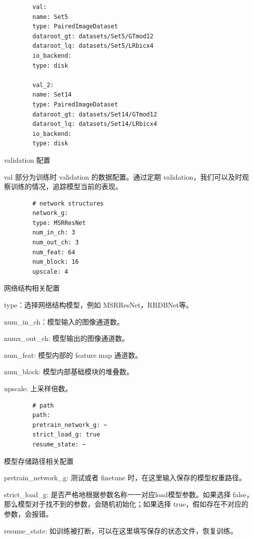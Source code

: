 \documentclass[../main.tex]{subfiles}
\begin{document}
	\begin{verbatim}
		val:
		name: Set5
		type: PairedImageDataset
		dataroot_gt: datasets/Set5/GTmod12
		dataroot_lq: datasets/Set5/LRbicx4
		io_backend:
		type: disk
		
		val_2:
		name: Set14
		type: PairedImageDataset
		dataroot_gt: datasets/Set14/GTmod12
		dataroot_lq: datasets/Set14/LRbicx4
		io_backend:
		type: disk
	\end{verbatim}
	\begin{exampleBox}[righthand ratio=0.00, sidebyside, sidebyside align=center, lower separated=false]{validation 配置}
		
		val 部分为训练时 validation 的数据配置。通过定期 validation，我们可以及时观察训练的情况，追踪模型当前的表现。
	\end{exampleBox}
	\begin{verbatim}
		# network structures
		network_g:
		type: MSRResNet
		num_in_ch: 3
		num_out_ch: 3
		num_feat: 64
		num_block: 16
		upscale: 4
	\end{verbatim}
	\begin{exampleBox}[righthand ratio=0.00, sidebyside, sidebyside align=center, lower separated=false]{网络结构相关配置}
		
		type：选择网络结构模型，例如 MSRResNet，RRDBNet等。
		
		num\_in\_ch：模型输入的图像通道数。
		
		numx\_out\_ch: 模型输出的图像通道数。
		
		num\_feat: 模型内部的 feature map 通道数。
		
		num\_block: 模型内部基础模块的堆叠数。
		
		upscale: 上采样倍数。
	\end{exampleBox}
	\begin{verbatim}
		# path
		path:
		pretrain_network_g: ~
		strict_load_g: true
		resume_state: ~
	\end{verbatim}
	\begin{exampleBox}[righthand ratio=0.00, sidebyside, sidebyside align=center, lower separated=false]{模型存储路径相关配置}
		
		pretrain\_network\_g: 测试或者 finetune 时，在这里输入保存的模型权重路径。
		
		strict\_load\_g: 是否严格地根据参数名称一一对应load模型参数。如果选择 false，那么模型对于找不到的参数，会随机初始化；如果选择 true，假如存在不对应的参数，会报错。
		
		resume\_state: 如训练被打断，可以在这里填写保存的状态文件，恢复训练。
	\end{exampleBox}
\end{document}
